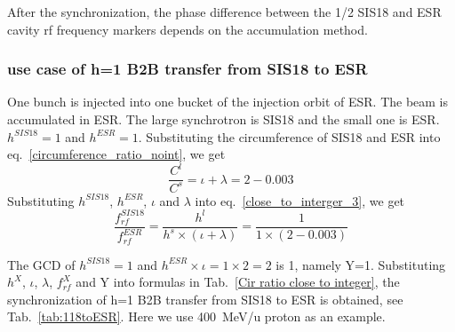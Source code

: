 After the synchronization, the phase difference between the 1/2 SIS18 and ESR cavity rf frequency markers depends on the accumulation method.

\subsubsection{use case of h=1 B2B transfer from SIS18 to ESR} 
One bunch is injected into one bucket of the injection orbit of ESR. The beam is accumulated in ESR. The large synchrotron is SIS18 and the small one is ESR. $h^{SIS18}=1$ and $h^{ESR}=1$. Substituting the circumference of SIS18 and ESR into eq.~\ref{circumference_ratio_noint}, we get
\begin{equation}
\frac{C^l}{C^s}=\iota + \lambda =2-0.003
\end{equation}
Substituting $h^{SIS18}$, $h^{ESR}$, $\iota$ and $\lambda$ into eq.~\ref{close_to_interger_3}, we get
\begin{equation}
\frac {f_{rf}^{SIS18}}{f_{rf}^{ESR}}= \frac{h^l}{h^s \times (\iota+ \lambda)}=\frac {1}{1 \times(2-0.003)}
\end{equation}

The GCD of $h^{SIS18}=1$ and $h^{ESR}\times \iota=1\times 2=2$ is 1, namely Y=1.  Substituting $h^X$, $\iota$, $\lambda$, $f_{rf}^{X}$ and Y into formulas in Tab.~\ref{Cir ratio close to integer}, the synchronization of h=1 B2B transfer from SIS18 to ESR is obtained, see Tab.~\ref{tab:118toESR}. Here we use \SI{400}{MeV/\atomicmassunit} proton as an example. 

